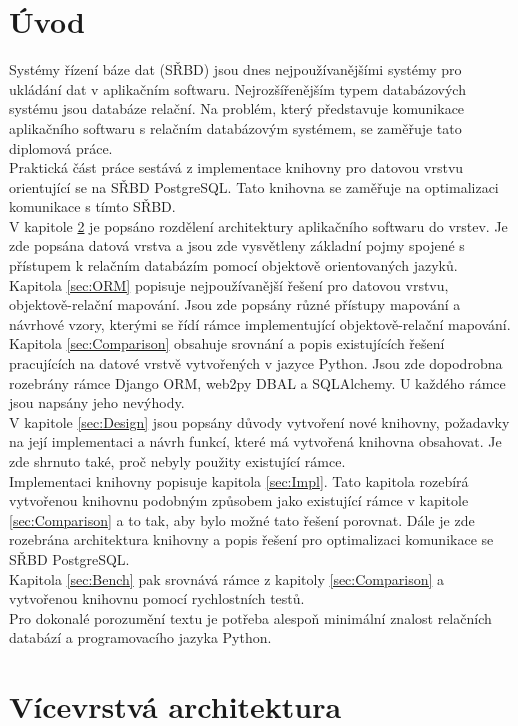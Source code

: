 \documentclass[ing,male,java,dept456]{diploma}						%
\begin{document}
\section{Úvod}
\label{sec:Intro}
Systémy řízení báze dat (SŘBD) jsou dnes nejpoužívanějšími systémy pro ukládání dat v aplikačním softwaru. Nejrozšířenějším typem databázových systému jsou databáze relační. Na problém, který představuje komunikace aplikačního softwaru s relačním databázovým systémem, se zaměřuje tato diplomová práce. \\
Praktická část práce sestává z implementace knihovny pro datovou vrstvu orientující se na SŘBD PostgreSQL. Tato knihovna se zaměřuje na optimalizaci komunikace s tímto SŘBD. \\
V kapitole \ref{sec:Layers} je popsáno rozdělení architektury aplikačního softwaru do vrstev. Je zde popsána datová vrstva a jsou zde vysvětleny základní pojmy spojené s přístupem k relačním databázím pomocí objektově orientovaných jazyků. \\
Kapitola \ref{sec:ORM} popisuje nejpoužívanější řešení pro datovou vrstvu, objektově-relační mapování. Jsou zde popsány různé přístupy mapování a návrhové vzory, kterými se řídí rámce implementující objektově-relační mapování. \\
Kapitola \ref{sec:Comparison} obsahuje srovnání a popis existujících řešení pracujících na datové vrstvě vytvořených v jazyce Python. Jsou zde dopodrobna rozebrány rámce Django ORM, web2py DBAL a SQLAlchemy. U každého rámce jsou napsány jeho nevýhody. \\
V kapitole \ref{sec:Design} jsou popsány důvody vytvoření nové knihovny, požadavky na její implementaci a návrh funkcí, které má vytvořená knihovna obsahovat. Je zde shrnuto také, proč nebyly použity existující rámce. \\
Implementaci knihovny popisuje kapitola \ref{sec:Impl}. Tato kapitola rozebírá vytvořenou knihovnu podobným způsobem jako existující rámce v kapitole \ref{sec:Comparison} a to tak, aby bylo možné tato řešení porovnat. Dále je zde rozebrána architektura knihovny a popis řešení pro optimalizaci komunikace se SŘBD PostgreSQL. \\
Kapitola \ref{sec:Bench} pak srovnává rámce z kapitoly \ref{sec:Comparison} a vytvořenou knihovnu pomocí rychlostních testů. \\
Pro dokonalé porozumění textu je potřeba alespoň minimální znalost relačních databází a programovacího jazyka Python.

\section{Vícevrstvá architektura}
\label{sec:Layers}
\end{document}
